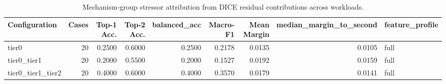 \begin{table}[t]
\centering
\caption{Mechanism-group stressor attribution from DICE residual contributions across workloads.}
\label{tab:dice_stressor_diagnosis}
\footnotesize
\begin{tabular}{lrrrrrrrl}
\toprule
Configuration & Cases & Top-1 Acc. & Top-2 Acc. & balanced_acc & Macro-F1 & Mean Margin & median_margin_to_second & feature_profile \\
\midrule
tier0 & 20 & 0.2500 & 0.6000 & 0.2500 & 0.2178 & 0.0135 & 0.0105 & full \\
tier0_tier1 & 20 & 0.2000 & 0.5500 & 0.2000 & 0.1527 & 0.0192 & 0.0159 & full \\
tier0_tier1_tier2 & 20 & 0.4000 & 0.6000 & 0.4000 & 0.3570 & 0.0179 & 0.0141 & full \\
\bottomrule
\end{tabular}

\end{table}
